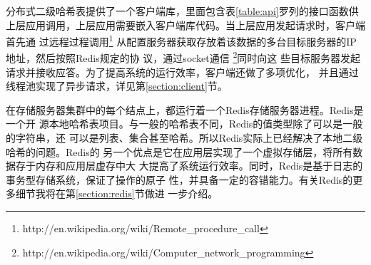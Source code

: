 分布式二级哈希表提供了一个客户端库，里面包含表\ref{table:api}罗列的接口函数供
上层应用调用，上层应用需要嵌入客户端库代码。当上层应用发起请求时，客户端首先通
过远程过程调用\footnote{http://en.wikipedia.org/wiki/Remote\_procedure\_call}
从配置服务器获取存放着该数据的多台目标服务器的IP地址，然后按照Redis规定的协
议，通过socket通信
\footnote{http://en.wikipedia.org/wiki/Computer\_network\_programming}同时向这
些目标服务器发起请求并接收应答。为了提高系统的运行效率，客户端还做了多项优化，
并且通过线程池实现了异步请求，详见第\ref{section:client}节。

在存储服务器集群中的每个结点上，都运行着一个Redis存储服务器进程。Redis是一个开
源本地哈希表项目。与一般的哈希表不同，Redis的值类型除了可以是一般的字符串，还
可以是列表、集合甚至哈希。所以Redis实际上已经解决了本地二级哈希的问题。Redis的
另一个优点是它在应用层实现了一个虚拟存储层，将所有数据存于内存和应用层虚存中大
大提高了系统运行效率。同时，Redis是基于日志的事务型存储系统，保证了操作的原子
性，并具备一定的容错能力。有关Redis的更多细节我将在第\ref{section:redis}节做进
一步介绍。

